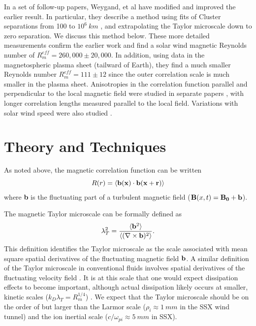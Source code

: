 \documentclass[aip,prl,amsmath,amssymb,reprint,superscriptaddress]{revtex4-1} %
\begin{document}
In a set of follow-up papers, Weygand, et al \cite{Weygand07,Weygand09,Weygand10,Weygand11} have modified and improved the earlier result.  In particular, they describe a method using fits of Cluster separations from 100 to $10^6~km$ \cite{Weygand07}, and extrapolating the Taylor microscale down to zero separation.  We discuss this method below.  These more detailed measurements confirm the earlier work  \cite{Matthaeus05} and find a solar wind magnetic Reynolds number of $R_m^{eff}  = 260,000 \pm 20,000$.  In addition, using data in the magnetospheric plasma sheet (tailward of Earth), they find a much smaller Reynolds number $R_m^{eff}  = 111 \pm 12$ since the outer correlation scale is much smaller in the plasma sheet.  Anisotropies in the correlation function parallel and perpendicular to the local magnetic field were studied in separate papers \cite{Weygand09,Weygand10}, with longer correlation lengths measured parallel to the local field.  Variations with solar wind speed were also studied \cite{Weygand11}.


\section{Theory and Techniques}

As noted above, the magnetic correlation function can be written
%
\begin{equation}
R(r) =  \langle {\bf b(x) \cdot b(x + r)} \rangle
\end{equation}
%
where {\bf b} is the fluctuating part of a turbulent magnetic field (${\bf B}(x, t) = {\bf B_0 + b}$). 

The magnetic Taylor microscale can be formally defined as
%
\begin{equation}
\lambda_T^2 = \frac{\langle {\bf b}^2 \rangle}{\langle (\nabla \times {\bf b})^2 \rangle}.
\label{eq:tayscale}
\end{equation}
%
This definition identifies the Taylor microscale as the scale associated with mean square spatial derivatives of the fluctuating magnetic field $\bf{b}$. A similar definition of the Taylor microscale in conventional fluids involves spatial derivatives of the fluctuating velocity field \cite{frisch95}. It is at this scale that one would expect dissipation effects to become important, although actual dissipation likely occurs at smaller, kinetic scales ($k_D \lambda_T = R_m^{1/4}$) \cite{Matthaeus08}.  We expect that the Taylor microscale should be on the order of but larger than the Larmor scale ($\rho_i \approx 1~mm$ in the SSX wind tunnel) and the ion inertial scale ($c/\omega_{pi} \approx 5~mm$ in SSX).
\end{document}
